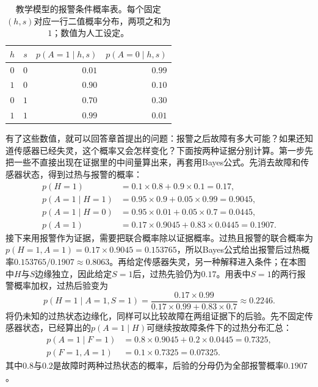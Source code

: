 \begin{table}[htbp]
  \centering
  \begin{tabular}{@{}ccrr@{}}
    \toprule
    $h$ & $s$ & $p(A=1\mid h,s)$ & $p(A=0\mid h,s)$ \\
    \midrule
    $0$ & $0$ & $0.01$ & $0.99$ \\
    $1$ & $0$ & $0.90$ & $0.10$ \\
    $0$ & $1$ & $0.70$ & $0.30$ \\
    $1$ & $1$ & $0.99$ & $0.01$ \\
    \bottomrule
  \end{tabular}
  \caption{教学模型的报警条件概率表。每个固定$(h,s)$对应一行二值概率分布，两项之和为$1$；数值为人工设定。}
  \label{tab:pgm-directed-alarm-cpt}
\end{table}

有了这些数值，就可以回答章首提出的问题：报警之后故障有多大可能？如果还知道传感器已经失灵，这个概率又会怎样变化？下面按两种证据分别计算。第一步先把一些不直接出现在证据里的中间量算出来，再套用Bayes公式。先消去故障和传感器状态，得到过热与报警的概率：
\[
  \begin{aligned}
    p(H=1)&=0.1\times0.8+0.9\times0.1=0.17,\\
    p(A=1\mid H=1)&=0.95\times0.9+0.05\times0.99=0.9045,\\
    p(A=1\mid H=0)&=0.95\times0.01+0.05\times0.7=0.0445,\\
    p(A=1)&=0.17\times0.9045+0.83\times0.0445=0.1907.
  \end{aligned}
\]
接下来用报警作为证据，需要把联合概率除以证据概率。过热且报警的联合概率为$p(H=1,A=1)=0.17\times0.9045=0.153765$，所以Bayes公式给出报警后过热概率$0.153765/0.1907\approx0.8063$。再给定传感器失灵，另一种解释进入条件；在本图中$H$与$S$边缘独立，因此给定$S=1$后，过热先验仍为$0.17$。用表中$S=1$的两行报警概率加权，过热后验变为
\[
  p(H=1\mid A=1,S=1)
    =\frac{0.17\times0.99}
      {0.17\times0.99+0.83\times0.7}
    \approx0.2246.
\]
将仍未知的过热状态边缘化，同样可以比较故障在两组证据下的后验。先不固定传感器状态，已经算出的$p(A=1\mid H)$可继续按故障条件下的过热分布汇总：
\[
  \begin{aligned}
    p(A=1\mid F=1)
      &=0.8\times0.9045+0.2\times0.0445=0.7325,\\
    p(F=1,A=1)&=0.1\times0.7325=0.07325.
  \end{aligned}
\]
其中$0.8$与$0.2$是故障时两种过热状态的概率，后验的分母仍为全部报警概率$0.1907$。

